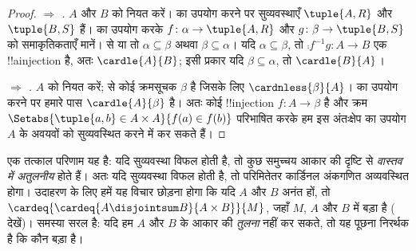 \documentclass[../../../include/open-logic-section]{subfiles}
\begin{document}
\begin{proof}
\emph{ $\Rightarrow$ .} $A$ और $B$ को
नियत करें।  का उपयोग करने पर सुव्यवस्थाएँ $\tuple{A,R}$ और
$\tuple{B,S}$ हैं।
 का उपयोग करके
$f\colon\alpha\to\tuple{A,R}$ और $g\colon\beta\to\tuple{B,S}$ को
समाकृतिकताएँ मानें।  से या
तो $\alpha\subseteq\beta$ अथवा $\beta\subseteq\alpha$। यदि
$\alpha\subseteq\beta$, तो $\comp{f^{-1}}{g}\colon A\to B$ एक
!!a{injection} है, अतः $\cardle{A}{B}$; इसी प्रकार यदि
$\beta\subseteq\alpha$, तो $\cardle{B}{A}$।

\emph{ $\Rightarrow$ .} $A$ को नियत
करें;  से कोई क्रमसूचक $\beta$ है जिसके लिए
$\cardnless{\beta}{A}$।  का उपयोग करने पर हमारे पास
$\cardle{A}{\beta}$ है। अतः कोई !!{injection} $f\colon A\to\beta$ है और
क्रम $\Setabs{\tuple{a,b}\in A\times A}{f(a)\in f(b)}$ परिभाषित करके हम इस
अंतःक्षेप का उपयोग $A$ के अवयवों को सुव्यवस्थित करने में कर सकते हैं।
\end{proof}
\noindent
एक तत्काल परिणाम यह है: यदि सुव्यवस्था विफल होती है, तो कुछ समुच्चय आकार
की दृष्टि से \emph{वास्तव में अतुलनीय} होते हैं। अतः यदि सुव्यवस्था विफल
होती है, तो परिमितेतर कार्डिनल अंकगणित अव्यवस्थित होगा। उदाहरण के लिए हमें
यह विचार छोड़ना होगा कि यदि $A$ और $B$ अनंत हों, तो
$\cardeq{\cardeq{A\disjointsum B}{A\times B}}{M}$, जहाँ $M$, $A$ और $B$
में बड़ा है ( देखें)। समस्या
सरल है: यदि हम $A$ और $B$ के आकार की \emph{तुलना} नहीं कर सकते, तो यह पूछना
निरर्थक है कि कौन बड़ा है।
\end{document}
